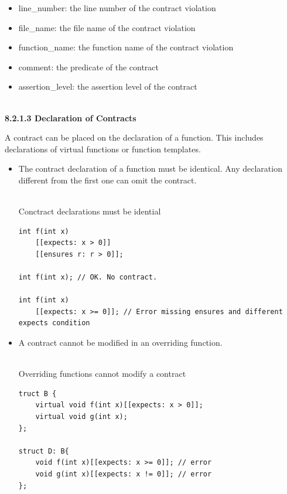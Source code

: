 \begin{itemize}
\item 
line\_number: the line number of the contract violation

\item 
file\_name: the file name of the contract violation

\item 
function\_name: the function name of the contract violation

\item 
comment: the predicate of the contract

\item 
assertion\_level: the assertion level of the contract
\end{itemize}

\hspace*{\fill} \\ %
\noindent
\textbf{8.2.1.3\hspace{0.2cm} Declaration of Contracts}

A contract can be placed on the declaration of a function. This includes declarations of virtual functions or function templates.

\begin{itemize}
\item 
The contract declaration of a function must be identical. Any declaration different from the first one can omit the contract.

\hspace*{\fill} \\ %
\noindent
Conctract declarations must be idential
\begin{lstlisting}[style=styleCXX]
int f(int x)
	[[expects: x > 0]]
	[[ensures r: r > 0]];

int f(int x); // OK. No contract.

int f(int x)
	[[expects: x >= 0]]; // Error missing ensures and different expects condition
\end{lstlisting}

\item 
A contract cannot be modified in an overriding function.

\hspace*{\fill} \\ %
\noindent
Overriding functions cannot modify a contract
\begin{lstlisting}[style=styleCXX]
truct B {
	virtual void f(int x)[[expects: x > 0]];
	virtual void g(int x);
};

struct D: B{
	void f(int x)[[expects: x >= 0]]; // error
	void g(int x)[[expects: x != 0]]; // error
};
\end{lstlisting}
\end{itemize}

